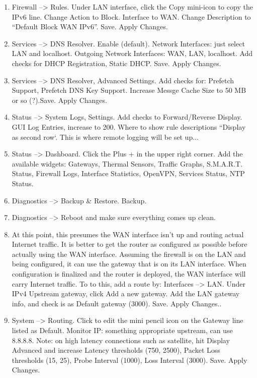 \begin{enumerate}
 \item Firewall --> Rules. Under LAN interface, click the Copy mini-icon to copy the IPv6 line. Change Action to Block. Interface to WAN. Change Description to ``Default Block WAN IPv6''. Save. Apply Changes.
 \item Services --> DNS Resolver. Enable (default). Network Interfaces: just select LAN and localhost. Outgoing Network Interfaces: WAN, LAN, localhost. Add checks for DHCP Registration, Static DHCP. Save. Apply Changes.
 \item Services --> DNS Resolver, Advanced Settings. Add checks for: Prefetch Support, Prefetch DNS Key Support. Increase Messge Cache Size to 50 MB or so (?).Save. Apply Changes.
 \item Status --> System Logs, Settings. Add checks to Forward/Reverse Display. GUI Log Entries, increase to 200. Where to show rule descriptions ``Display as second row`. This is where remote logging will be set up... 
 \item Status --> Dashboard. Click the Plus + in the upper right corner. Add the available widgets: Gateways, Thermal Sensors, Traffic Graphs, S.M.A.R.T. Status, Firewall Logs, Interface Statistics, OpenVPN, Services Status, NTP Status.
 \item Diagnostics --> Backup \& Restore. Backup.
 \item Diagnostics --> Reboot and make sure everything comes up clean.
 \item At this point, this presumes the WAN interface isn't up and routing actual Internet traffic. It is better to get the router as configured as possible before actually using the WAN interface. Assuming the firewall is on the LAN and being configured, it can use the gateway that is on its LAN interface. When configuration is finalized and the router is deployed, the WAN interface will carry Internet traffic. To to this, add a route by: Interfaces --> LAN. Under IPv4 Upstream gateway, click Add a new gateway. Add the LAN gateway info, and check is as Default gateway (3000). Save. Apply Changes..
 \item System --> Routing. Click to edit the mini pencil icon on the Gateway line listed as Default. Monitor IP: something appropriate upstream, can use 8.8.8.8. Note: on high latency connections such as satellite, hit Display Advanced and increase Latency thresholds (750, 2500), Packet Loss thresholds (15, 25), Probe Interval (1000), Loss Interval (3000). Save. Apply Changes.

\end{enumerate}
